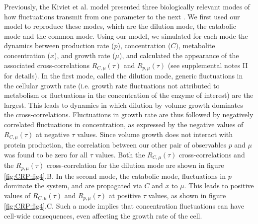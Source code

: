 Previously, the Kiviet et al. model 
presented three biologically relevant modes of how fluctuations transmit from one parameter to the next \cite{Kiviet2014}.
%
We first used our model to reproduce these modes,
which are the dilution mode, the catabolic mode and the common mode.
%
Using our model, we simulated for each mode the dynamics between production rate ($p$), concentration ($C$), metabolite concentration ($x$), and growth rate ($\mu$),
and calculated the appearance of the associated cross-correlations %
$R_{C,\mu}(\tau)$ and $R_{p,\mu}(\tau)$ (see supplemental notes II for details). %
%
In the first mode, called the dilution mode, 
generic fluctuations in the cellular growth rate 
(i.e. growth rate fluctuations not attributed to metabolism or fluctuations in the concentration of the enzyme of interest) are the largest. 
This  leads to dynamics in which dilution by volume growth dominates the cross-correlations.
Fluctuations in growth rate are thus followed by negatively correlated fluctuations in concentration, as expressed by the negative values of $R_{C,\mu}(\tau)$ at negative $\tau$ values.
Since volume growth does not interact with protein production, the correlation between our other pair of observables $p$ and $\mu$ was found to be zero for all $\tau$ values.
Both the $R_{C,\mu}(\tau)$ cross-correlations and the $R_{p,\mu}(\tau)$ cross-correlation for the dilution mode are shown in figure \ref{fig:CRP:fig4}.B.
%
In the second mode, the catabolic mode,
fluctuations in $p$ dominate the system, and are propagated via $C$ and $x$ to $\mu$.
This leads to  positive values of $R_{C,\mu}(\tau)$ and $R_{p,\mu}(\tau)$ at positive $\tau$ values, 
as shown in figure \ref{fig:CRP:fig4}.C.
Such a mode implies that concentration fluctuations can have cell-wide consequences, even affecting the growth rate of the cell.
